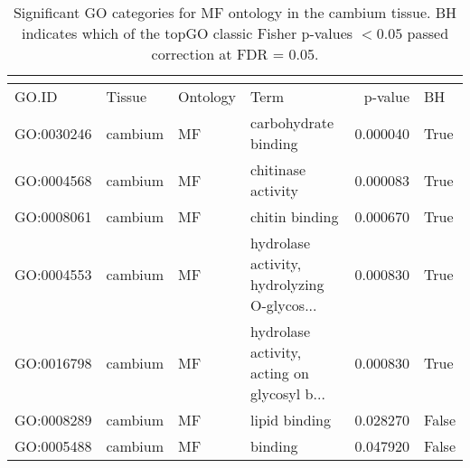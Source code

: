 \begin{longtable}{llllrl}
\caption{Significant GO categories for MF ontology in the cambium tissue. BH indicates which of the topGO classic Fisher p-values $< 0.05$ passed correction at FDR = 0.05.}\\
\label{tab:go-cambium-MF}\\
\toprule
GO.ID & Tissue & Ontology & Term & p-value & BH \\
\midrule
GO:0030246 & cambium & MF &                          carbohydrate binding  & 0.000040 &    True \\
GO:0004568 & cambium & MF &                            chitinase activity  & 0.000083 &    True \\
GO:0008061 & cambium & MF &                                chitin binding  & 0.000670 &    True \\
GO:0004553 & cambium & MF &   hydrolase activity, hydrolyzing O-glycos...  & 0.000830 &    True \\
GO:0016798 & cambium & MF &   hydrolase activity, acting on glycosyl b...  & 0.000830 &    True \\
GO:0008289 & cambium & MF &                                 lipid binding  & 0.028270 &   False \\
GO:0005488 & cambium & MF &                                       binding  & 0.047920 &   False \\
\bottomrule
\end{longtable}
